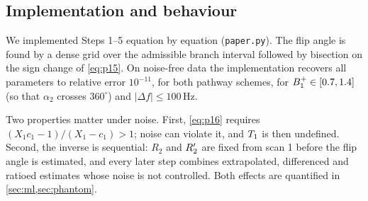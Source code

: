 \subsection{Implementation and behaviour}

We implemented Steps 1--5 equation by equation (\texttt{paper.py}). The flip angle is found
by a dense grid over the admissible branch interval followed by bisection on the sign change
of \eqref{eq:p15}. On noise-free data the implementation recovers all parameters to relative
error $10^{-11}$, for both pathway schemes, for $B_1^{+}\in[0.7,1.4]$ (so that $\alpha_2$ crosses
$360^\circ$) and $|\Delta f|\le100$\,Hz.

Two properties matter under noise. First, \eqref{eq:p16} requires $(X_1c_1-1)/(X_1-c_1)>1$;
noise can violate it, and $T_1$ is then undefined. Second, the inverse is sequential: $R_2$
and $R_2'$ are fixed from scan 1 before the flip angle is estimated, and every later step
combines extrapolated, differenced and ratioed estimates whose noise is not controlled. Both
effects are quantified in \cref{sec:ml,sec:phantom}.
